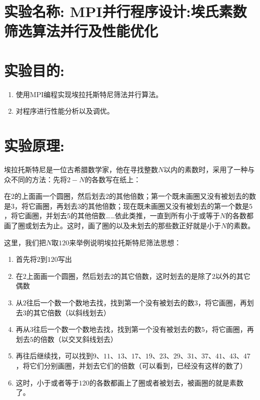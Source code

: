 \documentclass[a4paper,11pt,UTF8]{ctexart}
\begin{document}
\section{实验名称: MPI并行程序设计:埃氏素数筛选算法并行及性能优化}
\section{实验目的:}
\begin{enumerate}
  \item 使用MPI编程实现埃拉托斯特尼筛法并行算法。
  \item 对程序进行性能分析以及调优。
\end{enumerate}

\section{实验原理:}

埃拉托斯特尼是一位古希腊数学家，他在寻找整数$N$以内的素数时，采用了一种与众不同的方法：先将$2-N$的各数写在纸上：

在$2$的上面画一个圆圈，然后划去$2$的其他倍数；第一个既未画圈又没有被划去的数是$3$，将它画圈，再划去$3$的其他倍数；现在既未画圈又没有被划去的第一个数是$5$，将它画圈，并划去$5$的其他倍数……依此类推，一直到所有小于或等于$N$的各数都画了圈或划去为止。这时，画了圈的以及未划去的那些数正好就是小于$N$的素数。

这里，我们把$N$取$120$来举例说明埃拉托斯特尼筛法思想：

\begin{enumerate}
  \item 首先将$2$到$120$写出
  \item 在$2$上面画一个圆圈，然后划去$2$的其它倍数，这时划去的是除了$2$以外的其它偶数
  \item 从$2$往后一个数一个数地去找，找到第一个没有被划去的数$3$，将它画圈，再划去$3$的其它倍数（以斜线划去）
  \item 再从$3$往后一个数一个数地去找，找到第一个没有被划去的数$5$，将它画圈，再划去$5$的倍数（以交叉斜线划去）
  \item 再往后继续找，可以找到$9$、$11$、$13$、$17$、$19$、$23$、$29$、$31$、$37$、$41$、$43$、$47$，将它们分别画圈，并划去它们的倍数（可以看到，已经没有这样的数了）
  \item 这时，小于或者等于$120$的各数都画上了圈或者被划去，被画圈的就是素数了。
\end{enumerate}
\end{document}

